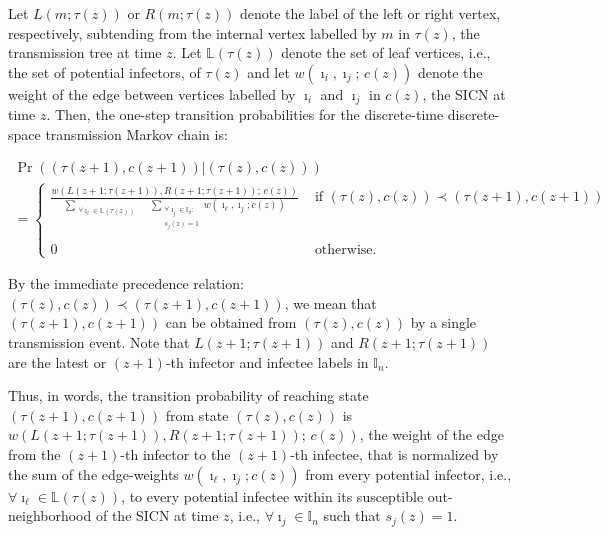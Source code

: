 \documentclass[review]{elsarticle}
\numberwithin{equation}{section}
\newcommand{\bI}{{\mathbb I}}
\newcommand{\bL}{{\mathbb L}}
\begin{document}
Let $L(m;\tau(z))$ or $R(m;\tau(z))$ denote the label of the left or right vertex, respectively, subtending from the internal vertex labelled by $m$ in $\tau(z)$, the transmission tree at time $z$.  
Let $\bL(\tau(z))$ denote the set of leaf vertices, i.e., the set of potential infectors, of $\tau(z)$ and
let $w(\imath_i,\imath_j;\,c(z))$ denote the weight of the edge between vertices labelled by $\imath_i$ and $\imath_j$ in $c(z)$, the SICN at time $z$.  Then, the one-step transition probabilities for the discrete-time discrete-space transmission Markov chain is:

\begin{multline}\label{E:GenJumpchainProb}
\Pr\left( (\tau(z+1),c(z+1)) | (\tau(z),c(z)) \right)\\
=
\begin{cases}
\frac{w(L(z+1;\tau(z+1)),R(z+1;\tau(z+1));\, c(z))}
{\sum\limits_{\substack{\forall \imath_{\ell} \in \bL(\tau(z))}} \quad
\sum\limits_{\substack{\forall \imath_j \in \bI_n :\\ s_j(z)=1}}
w(\imath_{\ell},\imath_j ; c(z))}
& \text{ if } (\tau(z),c(z)) \prec (\tau(z+1),c(z+1))\\\\
0 & \text{ otherwise}.
\end{cases}
\end{multline}

By the immediate precedence relation: $(\tau(z),c(z)) \prec (\tau(z+1),c(z+1))$, 
we mean that $(\tau(z+1),c(z+1))$ can be obtained from $(\tau(z),c(z))$ by a single transmission event.  
Note that $L(z+1;\tau(z+1))$ and $R(z+1;\tau(z+1))$ are the latest or $(z+1)$-th infector and infectee labels in $\bI_n$.  

Thus, in words, the transition probability of reaching state $(\tau(z+1),c(z+1))$ from state 
$(\tau(z),c(z))$ is $w(L(z+1;\tau(z+1)),R(z+1;\tau(z+1));\, c(z))$, the weight of the edge from the $(z+1)$-th infector to the $(z+1)$-th infectee, that is normalized by the sum of the edge-weights $w(\imath_{\ell},\imath_j ; c(z))$ from every potential infector, i.e., 
$\forall \imath_{\ell} \in \bL(\tau(z))$, to every potential infectee within its susceptible out-neighborhood of the SICN at time $z$, i.e., $\forall \imath_j \in \bI_n$ such that $s_j(z)=1$.
\end{document}
